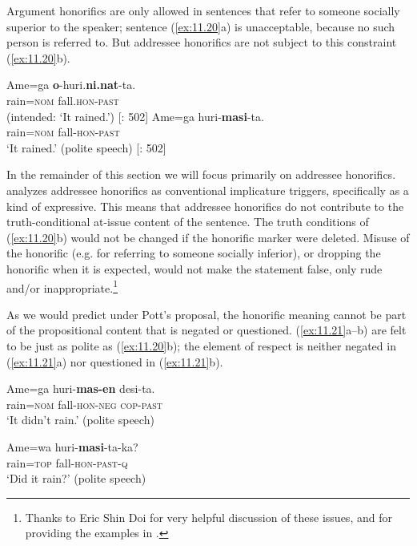 Argument honorifics are only allowed in sentences that refer to someone socially superior to the speaker; sentence (\ref{ex:11.20}a) is unacceptable, because no such person is referred to. But addressee honorifics are not subject to this constraint (\ref{ex:11.20}b).


\ea \label{ex:11.20} \ea  \gll *Ame=ga  \textbf{o}-huri.\textbf{ni.nat}-ta.\\
  rain=\textsc{nom}  fall.\textsc{hon-past}\\
\glt (intended: ‘It rained.’)  [\citealt{Harada1976}: 502]
\ex \gll
Ame=ga  huri-\textbf{masi}-ta.\\
rain=\textsc{nom}  fall-\textsc{hon-past}\\
\glt ‘It rained.’  (polite speech)   [\citealt{Harada1976}: 502]
\z \z


In the remainder of this section we will focus primarily on addressee honorifics. \citet{Potts2005} analyzes addressee honorifics as conventional implicature triggers, specifically as a kind of expressive. This means that addressee honorifics do not contribute to the truth-conditional at-issue content of the sentence. The truth conditions of (\ref{ex:11.20}b) would not be changed if the honorific marker were deleted. Misuse of the honorific (e.g. for referring to someone socially inferior), or dropping the honorific when it is expected, would not make the statement false, only rude and/or inappropriate.\footnote{Thanks to Eric Shin Doi for very helpful discussion of these issues, and for providing the examples in .}



As we would predict under Pott’s proposal, the honorific meaning cannot be part of the propositional content that is negated or questioned. (\ref{ex:11.21}a--b) are felt to be just as polite as (\ref{ex:11.20}b); the element of respect is neither negated in (\ref{ex:11.21}a) nor questioned in (\ref{ex:11.21}b).


\ea \label{ex:11.21}
\ea  \gll Ame=ga                 huri-\textbf{mas-en}  desi-ta.\\
            rain=\textsc{nom}  fall-\textsc{hon-neg}  \textsc{cop-past}\\
\glt ‘It didn’t rain.’  (polite speech)

\ex
 \gll  Ame=wa  huri-\textbf{masi}-ta-ka?\\
rain=\textsc{top}  fall-\textsc{hon-past-q}\\
\glt ‘Did it rain?’  (polite speech)
\z \z


